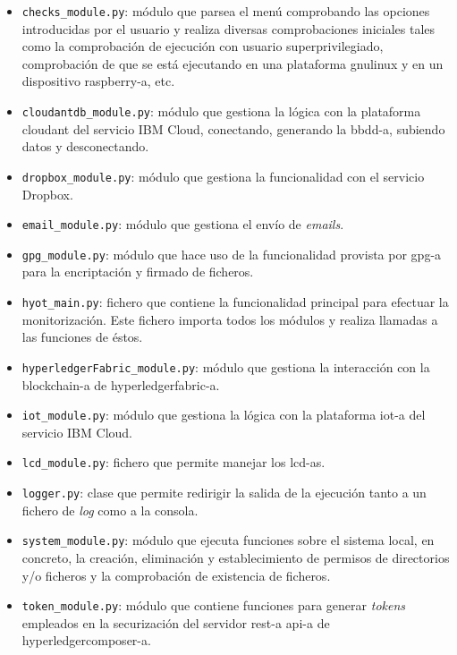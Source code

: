 \documentclass[12pt,a4paper, twoside]{report}
\begin{document}
\begin{itemize}
\begin{itemize}
			\item \texttt{checks\_module.py}: módulo que parsea el menú comprobando las opciones introducidas por el usuario y realiza diversas comprobaciones iniciales tales como la comprobación de ejecución con usuario superprivilegiado, comprobación de que se está ejecutando en una plataforma \gls{gnulinux} y en un dispositivo \gls{raspberry-a}, etc.
			\item \texttt{cloudantdb\_module.py}: módulo que gestiona la lógica con la plataforma \gls{cloudant} del servicio IBM Cloud, conectando, generando la \gls{bbdd-a}, subiendo datos y desconectando. 
			\item \texttt{dropbox\_module.py}: módulo que gestiona la funcionalidad con el servicio Dropbox.
			\item \texttt{email\_module.py}: módulo que gestiona el envío de \textit{emails}.
			\item \texttt{gpg\_module.py}: módulo que hace uso de la funcionalidad provista por \gls{gpg-a} para la encriptación y firmado de ficheros.
			\item \texttt{hyot\_main.py}: fichero que contiene la funcionalidad principal para efectuar la monitorización. Este fichero importa todos los módulos y realiza llamadas a las funciones de éstos. 
			\item \texttt{hyperledgerFabric\_module.py}: módulo que gestiona la interacción con la \gls{blockchain-a} de \gls{hyperledgerfabric-a}.
			\item \texttt{iot\_module.py}: módulo que gestiona la lógica con la plataforma \gls{iot-a} del servicio IBM Cloud.
			\item \texttt{lcd\_module.py}: fichero que permite manejar los \glspl{lcd-a}.
			\item \texttt{logger.py}: clase que permite redirigir la salida de la ejecución tanto a un fichero de \textit{log} como a la consola.
			\item \texttt{system\_module.py}: módulo que ejecuta funciones sobre el sistema local, en concreto, la creación, eliminación y establecimiento de permisos de directorios y/o ficheros y la comprobación de existencia de ficheros.
			\item \texttt{token\_module.py}: módulo que contiene funciones para generar \textit{\glspl{token}} empleados en la securización del servidor \gls{rest-a} \gls{api-a} de \gls{hyperledgercomposer-a}.
		\end{itemize}	
	\end{itemize}
	
\end{document}
